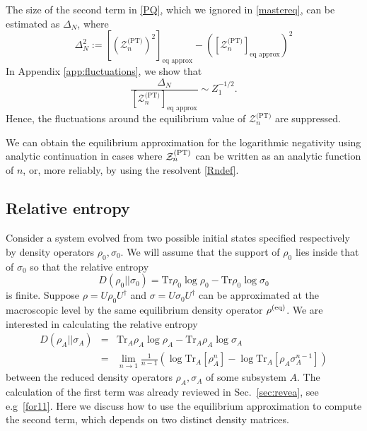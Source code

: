 \documentclass[a4paper,11pt]{article}
\newcommand{\be}{\begin{equation}}
\newcommand{\ee}{\end{equation}}
\newcommand{\bea}{\begin{eqnarray}}
\newcommand{\eea}{\end{eqnarray}}
\newcommand\sig{\sigma}
\newcommand\da{{\dagger}}
\newcommand\sZ{{\mathcal Z}}
\newcommand{\Tr}{\text{Tr}}
\begin{document}
{The size of the} second term in \eqref{PQ}, which we ignored in \eqref{mastereq}, can be estimated as $\Delta_N$, where 
\be 
\label{neg_q} 
\Delta_N^2 := [(\sZ_n^{\text{(PT)}})^2]_{\text{eq approx}}- \left([\sZ_n^{\text{(PT)}}]_{\text{eq approx}}\right)^2 
\ee
In Appendix \ref{app:fluctuations}, we show that 
\be 
\frac{\Delta_N}{[\sZ_n^{\text{(PT)}}]_{\text{eq approx}}} \sim Z_1^{-1/2}. 
\label{Delta}
\ee
Hence, the fluctuations around the equilibrium value of $\sZ_n^{\text{(PT)}}$ are suppressed. 

We can obtain the equilibrium approximation for the logarithmic negativity using analytic continuation in cases where $\sZ_n^{\rm (PT)}$ can be written as an analytic function of $n$, or, more reliably, by using the resolvent \eqref{Rndef}. 




\subsection{Relative entropy} 


Consider a system evolved from two possible initial states specified respectively by density operators $\rho_0, \sig_0$. We will assume that the support of $\rho_0$ lies inside that of $\sig_0$ so that the relative entropy 
\be 
D (\rho_0||\sig_0) = \Tr \rho_0 \log \rho_0 - \Tr \rho_0 \log \sig_0 
\ee
is finite. 
Suppose $\rho = U \rho_0 U^\da$ and $\sig= U \sig_0 U^\da$ can be approximated at the macroscopic level by the same equilibrium density operator $\rho^{(\rm eq)}$. We are interested in calculating the relative entropy 
\bea 
D (\rho_{A} || \sigma_{A}) &= & \Tr_{A} \rho_{A} \log \rho_{A} - \Tr_{A} \rho_{A} \log \sig_{A} \\
& = & \lim_{n\rightarrow 1} \frac{1}{n-1} \left(\log \Tr_{A} \left[\rho_{A}^n\right]- \log \Tr_{A} \left[\rho_{A} \sigma_{A}^{n-1}\right] \right)
 \label{relative_replica}
\eea
between the reduced density operators $\rho_{A}, \sig_{A}$ of some subsystem $A$. 
The calculation of the first term was already reviewed in Sec.~\ref{sec:revea}, see e.g~\eqref{for11}. Here we discuss how to use the equilibrium approximation to compute the second term, which depends on two distinct density matrices.
\end{document}
